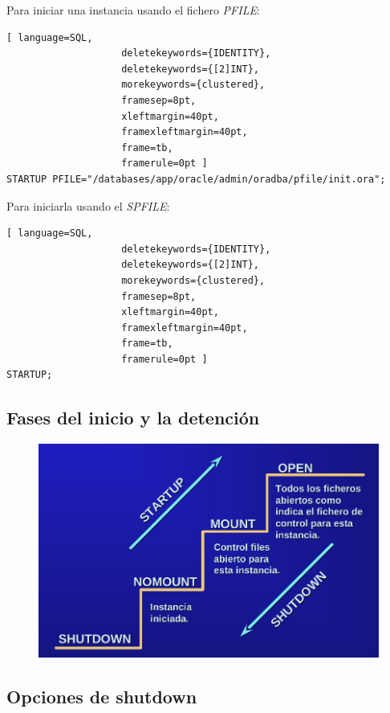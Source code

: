 Para iniciar una instancia usando el fichero \textit{PFILE}:

\begin{lstlisting}[ language=SQL,
                    deletekeywords={IDENTITY},
                    deletekeywords={[2]INT},
                    morekeywords={clustered},
                    framesep=8pt,
                    xleftmargin=40pt,
                    framexleftmargin=40pt,
                    frame=tb,
                    framerule=0pt ]
STARTUP PFILE="/databases/app/oracle/admin/oradba/pfile/init.ora";
\end{lstlisting}

Para iniciarla usando el \textit{SPFILE}:
\begin{lstlisting}[ language=SQL,
                    deletekeywords={IDENTITY},
                    deletekeywords={[2]INT},
                    morekeywords={clustered},
                    framesep=8pt,
                    xleftmargin=40pt,
                    framexleftmargin=40pt,
                    frame=tb,
                    framerule=0pt ]
STARTUP;
\end{lstlisting}

\subsection{Fases del inicio y la detención}

\begin{figure}[H]
  \center
  \includegraphics[scale=0.3]{img/p15.png}
\end{figure}

\subsection{Opciones de shutdown}

